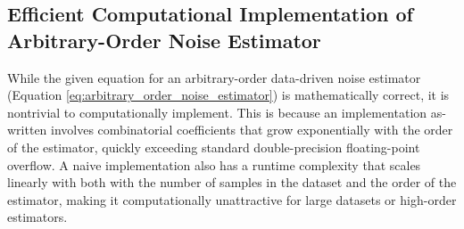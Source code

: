 \documentclass[conf]{new-aiaa}
\begin{document}
    \begin{figure}[H]
        \centering
        \label{fig:solar_surfer_design}
    \end{figure}

    \newpage

    \subsection{Efficient Computational Implementation of Arbitrary-Order Noise Estimator}
    \label{sec:estimator_code_example}

    While the given equation for an arbitrary-order data-driven noise estimator (Equation \ref{eq:arbitrary_order_noise_estimator}) is mathematically correct, it is nontrivial to computationally implement. This is because an implementation as-written involves combinatorial coefficients that grow exponentially with the order of the estimator, quickly exceeding standard double-precision floating-point overflow. A naive implementation also has a runtime complexity that scales linearly with both with the number of samples in the dataset and the order of the estimator, making it computationally unattractive for large datasets or high-order estimators.
\end{document}
